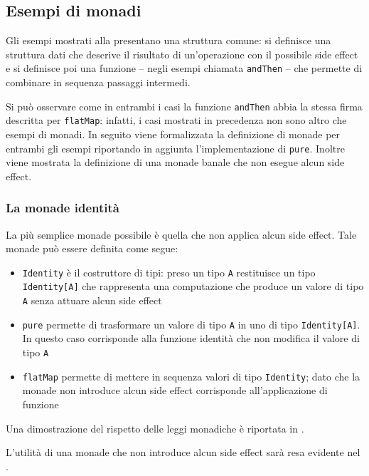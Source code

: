 \subsection{Esempi di monadi}
Gli esempi mostrati alla  presentano una struttura comune: si definisce una struttura dati che descrive il risultato di un'operazione con il possibile side effect e si definisce poi una funzione -- negli esempi chiamata \lstinline{andThen} -- che permette di combinare in sequenza passaggi intermedi.

Si può osservare come in entrambi i casi la funzione \lstinline{andThen} abbia la stessa firma descritta per \lstinline{flatMap}: infatti, i casi mostrati in precedenza non sono altro che esempi di monadi. In seguito viene formalizzata la definizione di monade per entrambi gli esempi riportando in aggiunta l'implementazione di \lstinline{pure}. Inoltre viene mostrata la definizione di una monade banale che non esegue alcun side effect.

\subsubsection{La monade identità}
\label{la-monade-identita}
La più semplice monade possibile è quella che non applica alcun side effect. Tale monade può essere definita come segue:

\begin{itemize}
  \item \lstinline{Identity} è il costruttore di tipi: preso un tipo \lstinline{A} restituisce un tipo \lstinline{Identity[A]} che rappresenta una computazione che produce un valore di tipo \lstinline{A} senza attuare alcun side effect
  \item \lstinline{pure} permette di trasformare un valore di tipo  \lstinline{A} in uno di tipo \lstinline{Identity[A]}. In questo caso corrisponde alla funzione identità che non modifica il valore di tipo \lstinline{A}
  \item \lstinline{flatMap} permette di mettere in sequenza valori di tipo \lstinline{Identity}; dato che la monade non introduce alcun side effect corrisponde all'applicazione di funzione
\end{itemize}

Una dimostrazione del rispetto delle leggi monadiche è riportata in .

L'utilità di una monade che non introduce alcun side effect sarà resa evidente nel .

